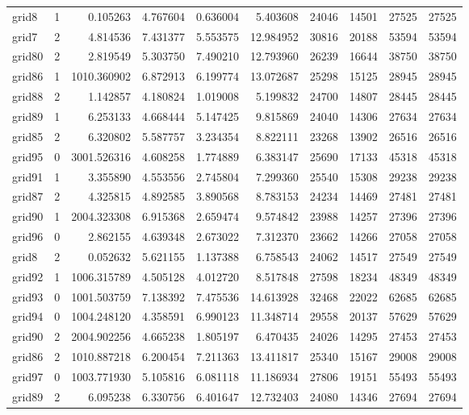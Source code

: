\begin{longtable}{|l|r|r|r|r|r|r|r|r|r|}
grid8 & 1 & 0.105263 & 4.767604 & 0.636004 & 5.403608 & 24046 & 14501 & 27525 & 27525 \\
grid7 & 2 & 4.814536 & 7.431377 & 5.553575 & 12.984952 & 30816 & 20188 & 53594 & 53594 \\
grid80 & 2 & 2.819549 & 5.303750 & 7.490210 & 12.793960 & 26239 & 16644 & 38750 & 38750 \\
grid86 & 1 & 1010.360902 & 6.872913 & 6.199774 & 13.072687 & 25298 & 15125 & 28945 & 28945 \\
grid88 & 2 & 1.142857 & 4.180824 & 1.019008 & 5.199832 & 24700 & 14807 & 28445 & 28445 \\
grid89 & 1 & 6.253133 & 4.668444 & 5.147425 & 9.815869 & 24040 & 14306 & 27634 & 27634 \\
grid85 & 2 & 6.320802 & 5.587757 & 3.234354 & 8.822111 & 23268 & 13902 & 26516 & 26516 \\
grid95 & 0 & 3001.526316 & 4.608258 & 1.774889 & 6.383147 & 25690 & 17133 & 45318 & 45318 \\
grid91 & 1 & 3.355890 & 4.553556 & 2.745804 & 7.299360 & 25540 & 15308 & 29238 & 29238 \\
grid87 & 2 & 4.325815 & 4.892585 & 3.890568 & 8.783153 & 24234 & 14469 & 27481 & 27481 \\
grid90 & 1 & 2004.323308 & 6.915368 & 2.659474 & 9.574842 & 23988 & 14257 & 27396 & 27396 \\
grid96 & 0 & 2.862155 & 4.639348 & 2.673022 & 7.312370 & 23662 & 14266 & 27058 & 27058 \\
grid8 & 2 & 0.052632 & 5.621155 & 1.137388 & 6.758543 & 24062 & 14517 & 27549 & 27549 \\
grid92 & 1 & 1006.315789 & 4.505128 & 4.012720 & 8.517848 & 27598 & 18234 & 48349 & 48349 \\
grid93 & 0 & 1001.503759 & 7.138392 & 7.475536 & 14.613928 & 32468 & 22022 & 62685 & 62685 \\
grid94 & 0 & 1004.248120 & 4.358591 & 6.990123 & 11.348714 & 29558 & 20137 & 57629 & 57629 \\
grid90 & 2 & 2004.902256 & 4.665238 & 1.805197 & 6.470435 & 24026 & 14295 & 27453 & 27453 \\
grid86 & 2 & 1010.887218 & 6.200454 & 7.211363 & 13.411817 & 25340 & 15167 & 29008 & 29008 \\
grid97 & 0 & 1003.771930 & 5.105816 & 6.081118 & 11.186934 & 27806 & 19151 & 55493 & 55493 \\
grid89 & 2 & 6.095238 & 6.330756 & 6.401647 & 12.732403 & 24080 & 14346 & 27694 & 27694 \\

\end{longtable}
